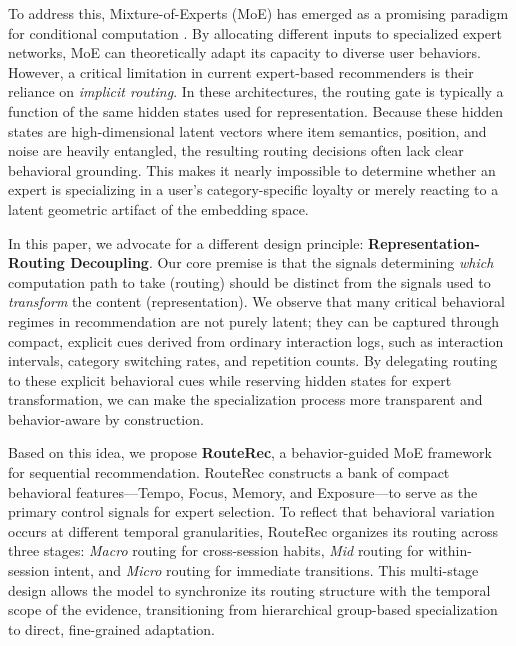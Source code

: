 \documentclass[sigconf,anonymous,review]{acmart-primary/acmart}
\begin{document}
To address this, Mixture-of-Experts (MoE) has emerged as a promising paradigm for conditional computation \cite{shazeer2017moe,fedus2022switch}. By allocating different inputs to specialized expert networks, MoE can theoretically adapt its capacity to diverse user behaviors. However, a critical limitation in current expert-based recommenders is their reliance on \textit{implicit routing}. In these architectures, the routing gate is typically a function of the same hidden states used for representation. Because these hidden states are high-dimensional latent vectors where item semantics, position, and noise are heavily entangled, the resulting routing decisions often lack clear behavioral grounding. This makes it nearly impossible to determine whether an expert is specializing in a user’s category-specific loyalty or merely reacting to a latent geometric artifact of the embedding space.

In this paper, we advocate for a different design principle: \textbf{Representation-Routing Decoupling}. Our core premise is that the signals determining \textit{which} computation path to take (routing) should be distinct from the signals used to \textit{transform} the content (representation). We observe that many critical behavioral regimes in recommendation are not purely latent; they can be captured through compact, explicit cues derived from ordinary interaction logs, such as interaction intervals, category switching rates, and repetition counts. By delegating routing to these explicit behavioral cues while reserving hidden states for expert transformation, we can make the specialization process more transparent and behavior-aware by construction.

Based on this idea, we propose \textbf{RouteRec}, a behavior-guided MoE framework for sequential recommendation. RouteRec constructs a bank of compact behavioral features—Tempo, Focus, Memory, and Exposure—to serve as the primary control signals for expert selection. To reflect that behavioral variation occurs at different temporal granularities, RouteRec organizes its routing across three stages: \textit{Macro} routing for cross-session habits, \textit{Mid} routing for within-session intent, and \textit{Micro} routing for immediate transitions. This multi-stage design allows the model to synchronize its routing structure with the temporal scope of the evidence, transitioning from hierarchical group-based specialization to direct, fine-grained adaptation.
\end{document}
